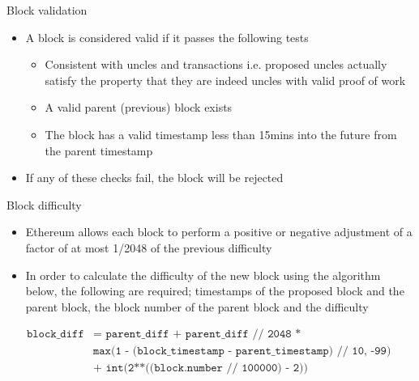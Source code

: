 \documentclass[9pt]{beamer}
\begin{document}

\begin{frame}{Block validation}
	\begin{itemize}
		\item A block is considered valid if it passes the following tests
		\begin{itemize}
			\item Consistent with uncles and transactions i.e. proposed uncles actually satisfy the property that they are indeed uncles with valid proof of work
			\item A valid parent (previous) block exists
			\item The block has a valid timestamp less than 15mins into the future from the parent timestamp
		\end{itemize}
		\item If any of these checks fail, the block will be rejected
	\end{itemize}
\end{frame}


\begin{frame}{Block difficulty}
	\begin{itemize}
		\item Ethereum allows each block to perform a positive or negative adjustment of a factor of at most 1/2048 of the previous difficulty
		\item In order to calculate the difficulty of the new block using the algorithm below, the following are required; timestamps of the proposed block and the parent block, the block number of the parent block and the difficulty
	\end{itemize}
	\begin{centering}
		\begin{footnotesize}
			\begin{align*}
				 \texttt{block\_diff} & \texttt{= parent\_diff + parent\_diff // 2048 * }\\
				 &   \texttt{max(1 - (block\_timestamp - parent\_timestamp) // 10, -99) }\\
				 &   \texttt{+ int(2**((block.number // 100000) - 2))}
			\end{align*}
		\end{footnotesize}
	\end{centering}
\end{frame}
\end{document}

